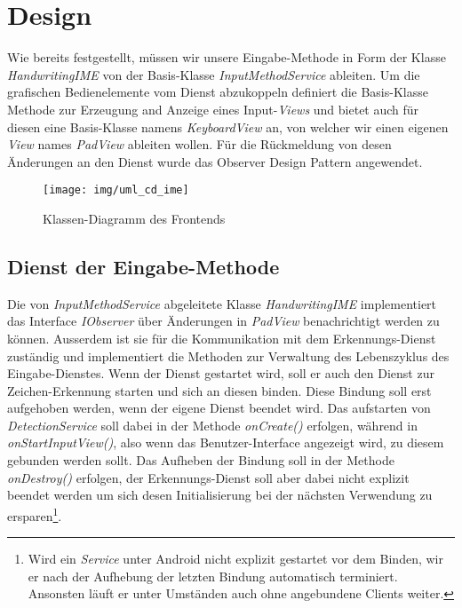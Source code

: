 \section{Design}

Wie bereits festgestellt, müssen wir unsere Eingabe-Methode in Form der Klasse \emph{HandwritingIME} von der Basis-Klasse \emph{InputMethodService} ableiten. Um die grafischen Bedienelemente vom Dienst abzukoppeln definiert die Basis-Klasse Methode zur Erzeugung and Anzeige eines Input-\emph{Views} und bietet auch für diesen eine Basis-Klasse namens \emph{KeyboardView} an, von welcher wir einen eigenen \emph{View} names \emph{PadView} ableiten wollen. Für die Rückmeldung von desen Änderungen an den Dienst wurde das Observer Design Pattern angewendet\cite[S.293-303]{designpatterns}.

\begin{figure}[h!]
   \centering
   \texttt{[image: img/uml\_cd\_ime]} 
   \caption{Klassen-Diagramm des Frontends}
   \label{fig:cd_ime}
\end{figure}

\subsection{Dienst der Eingabe-Methode}

Die von \emph{InputMethodService} abgeleitete Klasse \emph{HandwritingIME} implementiert das Interface \emph{IObserver} über Änderungen in \emph{PadView} benachrichtigt werden zu können. Ausserdem ist sie für die Kommunikation mit dem Erkennungs-Dienst zuständig und implementiert die Methoden zur Verwaltung des Lebenszyklus des Eingabe-Dienstes. Wenn der Dienst gestartet wird, soll er auch den Dienst zur Zeichen-Erkennung starten und sich an diesen binden. Diese Bindung soll erst aufgehoben werden, wenn der eigene Dienst beendet wird. Das aufstarten von \emph{DetectionService} soll dabei in der Methode \emph{onCreate()}  erfolgen, während in \emph{onStartInputView()}, also wenn das Benutzer-Interface angezeigt wird, zu diesem gebunden werden sollt. Das Aufheben der Bindung soll in der Methode \emph{onDestroy()} erfolgen, der Erkennungs-Dienst soll aber dabei nicht explizit beendet werden um sich desen Initialisierung bei der nächsten Verwendung zu ersparen\footnote{Wird ein \emph{Service} unter Android nicht explizit gestartet vor dem Binden, wir er nach der Aufhebung der letzten Bindung automatisch terminiert. Ansonsten läuft er unter Umständen auch ohne angebundene Clients weiter.}.

